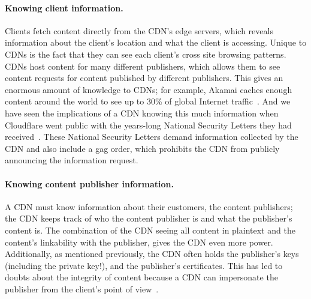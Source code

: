 \paragraph{Knowing client information.} Clients fetch content directly from the CDN's edge servers, which reveals 
information about the client's location and what the client is accessing.  Unique to CDNs is the fact that 
they can see each client's cross site browsing patterns.  CDNs host content for many different publishers, which allows 
them to see content requests for content published by different publishers.  This gives an enormous amount of 
knowledge to CDNs; for example, Akamai caches enough content around the world to see up to 30\% of global Internet 
traffic~\cite{akamai_global_traffic}.  And we have seen the implications of a CDN knowing this much information when Cloudflare 
went public with the years-long National Security Letters they had received~\cite{cloudflare_nsl}. These National Security Letters 
demand information collected by the CDN and also include a gag order, which prohibits the CDN from publicly announcing 
the information request.  

\paragraph{Knowing content publisher information.} A CDN must know information
about their customers, the content
publishers; the CDN keeps track of who the content publisher is and 
what the publisher's content is.  The combination of the CDN seeing all content in plaintext and the content's 
linkability with the publisher, gives the CDN even more power.  Additionally, as mentioned previously, the CDN often 
holds the publisher's keys (including the private key!), and the publisher's certificates.  This has led to doubts 
about the integrity of content because a CDN can impersonate the publisher from the client's point of view~\cite{levy2015stickler}.


